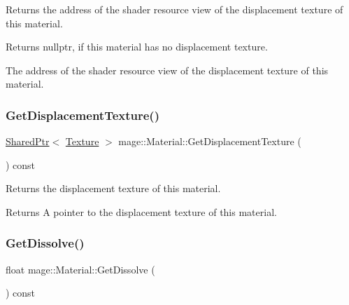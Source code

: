 Returns the address of the shader resource view of the displacement texture of this material.

\begin{DoxyReturn}{Returns}
{\ttfamily nullptr}, if this material has no displacement texture. 

The address of the shader resource view of the displacement texture of this material. 
\end{DoxyReturn}
\hypertarget{structmage_1_1_material_ab548fbf5844ae7cd2822304ef7fb9602}{}\label{structmage_1_1_material_ab548fbf5844ae7cd2822304ef7fb9602} 
\subsubsection{\texorpdfstring{Get\+Displacement\+Texture()}{GetDisplacementTexture()}}
{\footnotesize\ttfamily \hyperlink{namespacemage_a1e01ae66713838a7a67d30e44c67703e}{Shared\+Ptr}$<$ \hyperlink{classmage_1_1_texture}{Texture} $>$ mage\+::\+Material\+::\+Get\+Displacement\+Texture (\begin{DoxyParamCaption}{ }\end{DoxyParamCaption}) const\hspace{0.3cm}{\ttfamily [noexcept]}}

Returns the displacement texture of this material.

\begin{DoxyReturn}{Returns}
A pointer to the displacement texture of this material. 
\end{DoxyReturn}
\hypertarget{structmage_1_1_material_aa320c6b371b9f055a76821db71d185bc}{}\label{structmage_1_1_material_aa320c6b371b9f055a76821db71d185bc} 
\subsubsection{\texorpdfstring{Get\+Dissolve()}{GetDissolve()}}
{\footnotesize\ttfamily float mage\+::\+Material\+::\+Get\+Dissolve (\begin{DoxyParamCaption}{ }\end{DoxyParamCaption}) const\hspace{0.3cm}{\ttfamily [noexcept]}}

